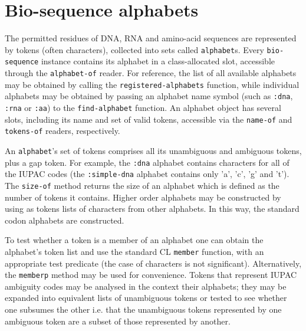 \documentclass[a4paper, 12pt]{article}
\begin{document}
\section{Bio-sequence alphabets}
\label{sec:alphabet-bioseq}

The permitted residues of DNA, RNA and amino-acid sequences are
represented by tokens (often characters), collected into sets called
\lstinline!alphabet!s. Every \lstinline!bio-sequence! instance
contains its alphabet in a class-allocated slot, accessible through
the \lstinline!alphabet-of! reader. For reference, the list of all
available alphabets may be obtained by calling the
\lstinline!registered-alphabets! function, while individual alphabets
may be obtained by passing an alphabet name symbol (such as
\lstinline!:dna!, \lstinline!:rna! or \lstinline!:aa!) to the
\lstinline!find-alphabet! function. An alphabet object has several
slots, including its name and set of valid tokens, accessible via the
\lstinline!name-of! and \lstinline!tokens-of! readers, respectively.

An \lstinline!alphabet!'s set of tokens comprises all its unambiguous
and ambiguous tokens, plus a gap token. For example, the
\lstinline!:dna! alphabet contains characters for all of the IUPAC
codes (the \lstinline!:simple-dna! alphabet contains only 'a', 'c',
'g' and 't'). The \lstinline!size-of! method returns the size of an
alphabet which is defined as the number of tokens it contains. Higher
order alphabets may be constructed by using as tokens lists of
characters from other alphabets. In this way, the standard codon
alphabets are constructed.

To test whether a token is a member of an alphabet one can obtain the
alphabet's token list and use the standard CL \lstinline!member!
function, with an appropriate test predicate (the case of characters
is not significant). Alternatively, the \lstinline!memberp! method may
be used for convenience. Tokens that represent IUPAC ambiguity codes
may be analysed in the context their alphabets; they may be expanded
into equivalent lists of unambiguous tokens or tested to see whether
one subsumes the other i.e. that the unambiguous tokens represented by
one ambiguous token are a subset of those represented by another.
\end{document}
